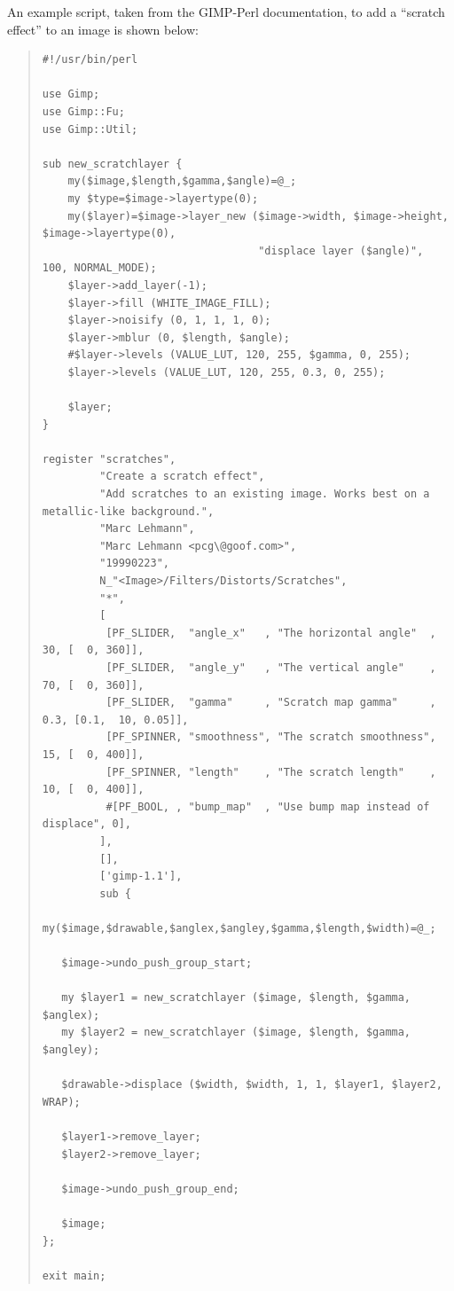 \documentclass[twoside,11pt]{article}
\begin{document}
An example script, taken from the GIMP-Perl documentation, to add a ``scratch effect'' to an image is shown below:

\small
\begin{quote}
\begin{verbatim}
#!/usr/bin/perl

use Gimp;
use Gimp::Fu;
use Gimp::Util;

sub new_scratchlayer {
    my($image,$length,$gamma,$angle)=@_;
    my $type=$image->layertype(0);
    my($layer)=$image->layer_new ($image->width, $image->height, $image->layertype(0),
                                  "displace layer ($angle)", 100, NORMAL_MODE);
    $layer->add_layer(-1);
    $layer->fill (WHITE_IMAGE_FILL);
    $layer->noisify (0, 1, 1, 1, 0);
    $layer->mblur (0, $length, $angle);
    #$layer->levels (VALUE_LUT, 120, 255, $gamma, 0, 255);
    $layer->levels (VALUE_LUT, 120, 255, 0.3, 0, 255);

    $layer;
}

register "scratches",
         "Create a scratch effect",
         "Add scratches to an existing image. Works best on a metallic-like background.",
         "Marc Lehmann",
         "Marc Lehmann <pcg\@goof.com>",
         "19990223",
         N_"<Image>/Filters/Distorts/Scratches",
         "*",
         [
          [PF_SLIDER,  "angle_x"   , "The horizontal angle"  ,  30, [  0, 360]],
          [PF_SLIDER,  "angle_y"   , "The vertical angle"    ,  70, [  0, 360]],
          [PF_SLIDER,  "gamma"     , "Scratch map gamma"     , 0.3, [0.1,  10, 0.05]],
          [PF_SPINNER, "smoothness", "The scratch smoothness",  15, [  0, 400]],
          [PF_SPINNER, "length"    , "The scratch length"    ,  10, [  0, 400]],
          #[PF_BOOL, , "bump_map"  , "Use bump map instead of displace", 0],
         ],
         [],
         ['gimp-1.1'],
         sub {
   my($image,$drawable,$anglex,$angley,$gamma,$length,$width)=@_;

   $image->undo_push_group_start;

   my $layer1 = new_scratchlayer ($image, $length, $gamma, $anglex);
   my $layer2 = new_scratchlayer ($image, $length, $gamma, $angley);

   $drawable->displace ($width, $width, 1, 1, $layer1, $layer2, WRAP);

   $layer1->remove_layer;
   $layer2->remove_layer;

   $image->undo_push_group_end;

   $image;
};

exit main;
\end{verbatim}
\end{quote}
\normalsize
\end{document}
